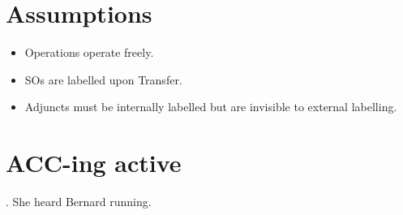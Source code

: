 \documentclass[letterpaper]{article}
\begin{document}
\section{Assumptions}

\begin{itemize}
  \item Operations operate freely.
  \item SOs are labelled upon Transfer.
  \item Adjuncts must be internally labelled but are invisible to external labelling. \parencite{hornstein2009theory}
\end{itemize}

\section{ACC-ing active}
\ex. She heard Bernard running.
\end{document}
